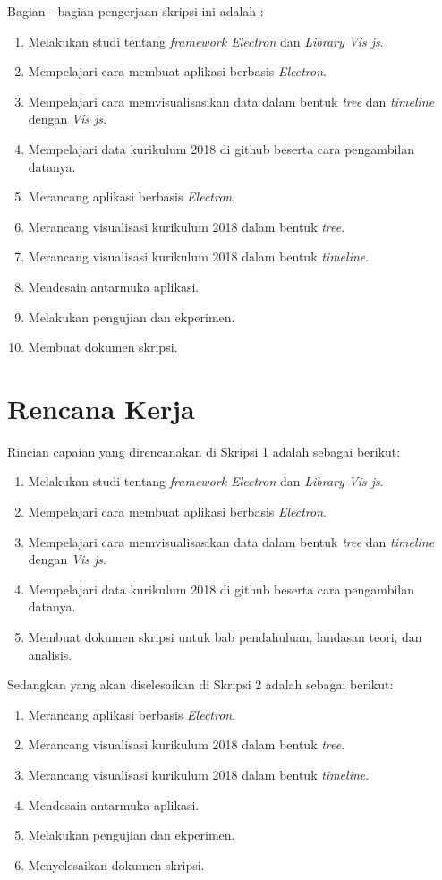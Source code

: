 \documentclass[a4paper,twoside]{article}
\begin{document}
Bagian - bagian pengerjaan skripsi ini adalah :
\begin{enumerate}
    \item Melakukan studi tentang \textit{framework Electron} dan \textit{Library Vis js}.
    \item Mempelajari cara membuat aplikasi berbasis \textit{Electron}.
    \item Mempelajari cara memvisualisasikan data dalam bentuk \textit{tree} dan \textit{timeline} dengan \textit{Vis js}.
    \item Mempelajari data kurikulum 2018 di github beserta cara pengambilan datanya.
    \item Merancang aplikasi berbasis \textit{Electron}.
    \item Merancang visualisasi kurikulum 2018 dalam bentuk \textit{tree}.
    \item Merancang visualisasi kurikulum 2018 dalam bentuk \textit{timeline}.
    \item Mendesain antarmuka aplikasi.
    \item Melakukan pengujian dan ekperimen.
    \item Membuat dokumen skripsi.
\end{enumerate}

\section{Rencana Kerja}

Rincian capaian yang direncanakan di Skripsi 1 adalah sebagai berikut:
\begin{enumerate}
    \item Melakukan studi tentang \textit{framework Electron} dan \textit{Library Vis js}.
    \item Mempelajari cara membuat aplikasi berbasis \textit{Electron}.
    \item Mempelajari cara memvisualisasikan data dalam bentuk \textit{tree} dan \textit{timeline} dengan \textit{Vis js}.
    \item Mempelajari data kurikulum 2018 di github beserta cara pengambilan datanya.
    \item Membuat dokumen skripsi untuk bab pendahuluan, landasan teori, dan analisis.
\end{enumerate}

\newpage
Sedangkan yang akan diselesaikan di Skripsi 2 adalah sebagai berikut:
\begin{enumerate}
\item Merancang aplikasi berbasis \textit{Electron}.
    \item Merancang visualisasi kurikulum 2018 dalam bentuk \textit{tree}.
    \item Merancang visualisasi kurikulum 2018 dalam bentuk \textit{timeline}.
    \item Mendesain antarmuka aplikasi.
    \item Melakukan pengujian dan ekperimen.
    \item Menyelesaikan dokumen skripsi.
\end{enumerate}
\end{document}
